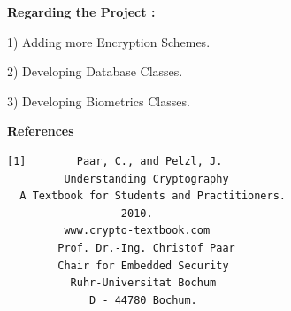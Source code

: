\documentclass{slides}
\begin{document}
\begin{center}
\textbf{Regarding the Project :}

1) Adding more Encryption Schemes.

2) Developing Database Classes.

3) Developing Biometrics Classes.
\end{center}
\newpage
\begin{center}
\textbf{\Large References}
\end{center}
\begin{center}
\begin{BVerbatim}
[1]        Paar, C., and Pelzl, J.
         Understanding Cryptography
  A Textbook for Students and Practitioners.
                  2010.
         www.crypto-textbook.com
        Prof. Dr.-Ing. Christof Paar 
        Chair for Embedded Security
          Ruhr-Universitat Bochum
             D - 44780 Bochum.
\end{BVerbatim}
\end{center}
\end{document}

